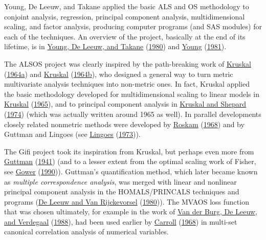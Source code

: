 \documentclass[
  12pt,
]{book}
\begin{document}
Young, De Leeuw, and Takane applied the basic ALS and OS methodology to conjoint analysis, regression, principal component analysis, multidimensional scaling, and factor analysis, producing computer programs (and SAS modules) for each of the techniques. An overview of the project, basically at the end of its lifetime, is in \protect\hyperlink{ref-young_deleeuw_takane_C_80}{Young, De Leeuw, and Takane} (\protect\hyperlink{ref-young_deleeuw_takane_C_80}{1980}) and \protect\hyperlink{ref-young_81}{Young} (\protect\hyperlink{ref-young_81}{1981}).

The ALSOS project was clearly inspired by the path-breaking work of \protect\hyperlink{ref-kruskal_64a}{Kruskal} (\protect\hyperlink{ref-kruskal_64a}{1964a}) and \protect\hyperlink{ref-kruskal_64b}{Kruskal} (\protect\hyperlink{ref-kruskal_64b}{1964b}), who designed a general way to turn metric multivariate analysis techniques into non-metric ones. In fact, Kruskal applied the basic methodology developed for multidimensional scaling to linear models in \protect\hyperlink{ref-kruskal_65}{Kruskal} (\protect\hyperlink{ref-kruskal_65}{1965}), and to principal component analysis in \protect\hyperlink{ref-kruskal_shepard_74}{Kruskal and Shepard} (\protect\hyperlink{ref-kruskal_shepard_74}{1974}) (which was actually written around 1965 as well). In parallel developments closely related nonmetric methods were developed by \protect\hyperlink{ref-roskam_68}{Roskam} (\protect\hyperlink{ref-roskam_68}{1968}) and by Guttman and Lingoes (see \protect\hyperlink{ref-lingoes_73}{Lingoes} (\protect\hyperlink{ref-lingoes_73}{1973})).

The Gifi project took its inspiration from Kruskal, but perhaps even more from \protect\hyperlink{ref-guttman_41}{Guttman} (\protect\hyperlink{ref-guttman_41}{1941}) (and to a lesser extent from the optimal scaling work of Fisher, see \protect\hyperlink{ref-gower_90}{Gower} (\protect\hyperlink{ref-gower_90}{1990})). Guttman's quantification method, which later became known as \emph{multiple correspondence analysis}, was merged with linear and nonlinear principal component analysis in the HOMALS/PRINCALS techniques and programs (\protect\hyperlink{ref-deleeuw_vanrijckevorsel_C_80}{De Leeuw and Van Rijckevorsel} (\protect\hyperlink{ref-deleeuw_vanrijckevorsel_C_80}{1980})). The MVAOS loss function that was chosen ultimately, for example in the work of \protect\hyperlink{ref-vanderburg_deleeuw_verdegaal_A_88}{Van der Burg, De Leeuw, and Verdegaal} (\protect\hyperlink{ref-vanderburg_deleeuw_verdegaal_A_88}{1988}), had been used earlier by \protect\hyperlink{ref-carroll_68}{Carroll} (\protect\hyperlink{ref-carroll_68}{1968}) in multi-set canonical correlation analysis of numerical variables.
\end{document}
